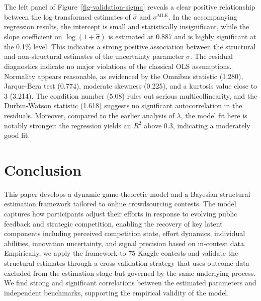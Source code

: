 \documentclass[mnsc]{informs3}
\begin{document}
The left panel of Figure~\ref{fig-validation-sigma} reveals a clear positive relationship between the log-transformed estimates of $\hat{\sigma}$ and $\sigma^{\text{MLE}}$. 
In the accompanying regression results, the intercept is small and statistically insignificant, while the slope coefficient on $\log(1 + \hat{\sigma})$ is estimated at 0.887 and is highly significant at the 0.1\% level. 
This indicates a strong positive association between the structural and non-structural estimates of the uncertainty parameter $\sigma$.
The residual diagnostics indicate no major violations of the classical OLS assumptions. 
Normality appears reasonable, as evidenced by the Omnibus statistic (1.280), Jarque-Bera test (0.774), moderate skewness (0.225), and a kurtosis value close to 3 (3.214). 
The condition number (5.08) rules out serious multicollinearity, and the Durbin-Watson statistic (1.618) suggests no significant autocorrelation in the residuals.
Moreover, compared to the earlier analysis of $\lambda$, the model fit here is notably stronger: the regression yields an $R^2$ above 0.3, indicating a moderately good fit. 


\section{Conclusion}

This paper develops a dynamic game-theoretic model and a Bayesian structural estimation framework tailored to online crowdsourcing contests.
The model captures how participants adjust their efforts in response to evolving public feedback and strategic competition, enabling the recovery of key latent components including perceived competition state, effort dynamics, individual abilities, innovation uncertainty, and signal precision based on in-contest data.
Empirically, we apply the framework to 75 Kaggle contests and validate the structural estimates through a cross-validation strategy that uses outcome data excluded from the estimation stage but governed by the same underlying process.
We find strong and significant correlations between the estimated parameters and independent benchmarks, supporting the empirical validity of the model.
\end{document}
